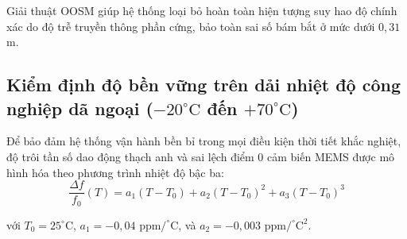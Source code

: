 Giải thuật OOSM giúp hệ thống loại bỏ hoàn toàn hiện tượng suy hao độ chính xác do độ trễ truyền thông phần cứng, bảo toàn sai số bám bắt ở mức dưới $0{,}31$ m.

\subsection{Kiểm định độ bền vững trên dải nhiệt độ công nghiệp dã ngoại \texorpdfstring{($-20^\circ\text{C}$ đến $+70^\circ\text{C}$)}{(-20 đến +70 độ C)}}

\hspace{0.5cm} Để bảo đảm hệ thống vận hành bền bỉ trong mọi điều kiện thời tiết khắc nghiệt, độ trôi tần số dao động thạch anh và sai lệch điểm 0 cảm biến MEMS được mô hình hóa theo phương trình nhiệt độ bậc ba:
\begin{equation}
\frac{\Delta f}{f_0}(T) = a_1 (T - T_0) + a_2 (T - T_0)^2 + a_3 (T - T_0)^3
\label{eq:temperature-frequency-drift-cubic}
\end{equation}

với $T_0 = 25^\circ\text{C}$, $a_1 = -0{,}04\text{ ppm/}^\circ\text{C}$, và $a_2 = -0{,}003\text{ ppm/}^\circ\text{C}^2$.

\begin{table}[H]
\centering
\caption{Khảo sát lý thuyết sai số bám bắt và độ ổn định thời gian thực trên dải nhiệt độ công nghiệp (mô hình trôi theo Datasheet)}
\label{tab:industrial-temperature-sweep-results}
\end{table}

